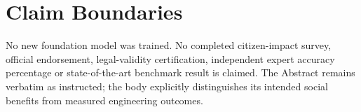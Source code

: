 \section{Claim Boundaries}
No new foundation model was trained. No completed citizen-impact survey, official endorsement, legal-validity certification, independent expert accuracy percentage or state-of-the-art benchmark result is claimed. The Abstract remains verbatim as instructed; the body explicitly distinguishes its intended social benefits from measured engineering outcomes.
